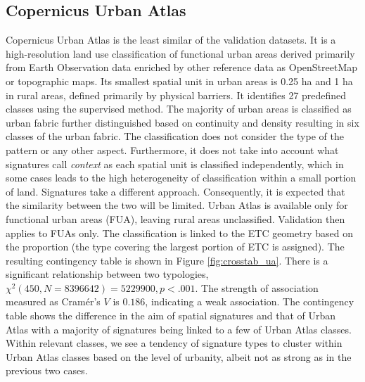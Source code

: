 \subsection*{Copernicus Urban Atlas}
Copernicus Urban Atlas is the least similar of the validation datasets. It is a
high-resolution land use classification of functional urban areas derived primarily from
Earth Observation data enriched by other reference data as OpenStreetMap or topographic
maps. Its smallest spatial unit in urban areas is 0.25 ha and 1 ha in rural areas,
defined primarily by physical barriers. It identifies
27 predefined classes using the supervised method.
The majority of urban areas is classified as urban fabric further distinguished based on
continuity and density resulting in six classes of the urban fabric. The classification does
not consider the type of the pattern or any other aspect. Furthermore, it does not take
into account what signatures call \textit{context} as each spatial unit is
classified independently, which in some cases leads to the high heterogeneity of
classification within a small portion of land. Signatures take a different approach.
Consequently, it is expected that the similarity between the two will be limited.
Urban Atlas is available only for functional urban areas (FUA), leaving rural areas
unclassified. Validation then applies to FUAs only. The classification is linked to the
ETC geometry based on the proportion (the type covering the largest portion of ETC is
assigned). The resulting contingency table is shown in Figure \ref{fig:crosstab_ua}. There is a
significant relationship between two typologies, $\chi^{2} (450, N = 8396642) = 5229900,
p < .001$. The strength of association measured as Cramér's $V$ is $0.186$, indicating
a weak association. The contingency table shows the difference in the aim of spatial
signatures and that of Urban Atlas with a majority of signatures being linked to a few
of Urban Atlas classes. Within relevant classes, we see a tendency of signature types to
cluster within Urban Atlas classes based on the level of urbanity, albeit not as strong
as in the previous two cases.

